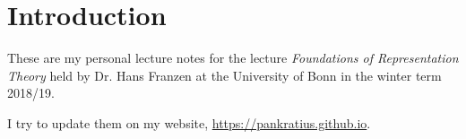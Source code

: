 \chapter*{Introduction}
These are my personal lecture notes for the lecture \textit{Foundations of Representation Theory} held by Dr. Hans Franzen at the University of Bonn in the winter term 2018/19.\par
I try to update them on my website, \url{https://pankratius.github.io}.
